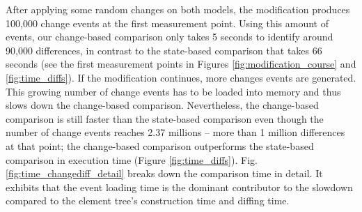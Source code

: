After applying some random changes on both models, the modification produces 100,000 change events at the first measurement point. Using this amount of events, our change-based comparison only takes 5 seconds to identify around 90,000 differences, in contrast to the state-based comparison that takes 66 seconds (see the first measurement points in Figures \ref{fig:modification_course} and \ref{fig:time_diffs}). If the modification continues, more changes events are generated. This growing number of change events has to be loaded into memory and thus slows down the change-based comparison. Nevertheless, the change-based comparison is still faster than the state-based comparison even though the number of change events reaches 2.37 millions -- more than 1 million differences at that point; the change-based comparison outperforms the state-based comparison in execution time (Figure \ref{fig:time_diffs}). Fig. \ref{fig:time_changediff_detail} breaks down the comparison time in detail. It exhibits that the event loading time is the dominant contributor to the slowdown compared to the element tree's construction time and diffing time. 

